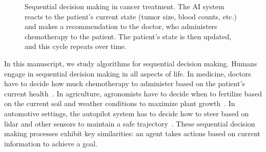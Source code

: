 \begin{figure}[htbp]
    \caption{Sequential decision making in cancer treatment. The AI system reacts to the patient's current state (tumor size, blood counts, etc.) and makes a recommendation to the doctor, who administers chemotherapy to the patient. The patient's state is then updated, and this cycle repeats over time.}
    \label{fig:cancer-treatment-sdm}
\end{figure}
In this manuscript, we study algorithms for sequential decision making. Humans engage in sequential decision making in all aspects of life. In medicine, doctors have to decide how much chemotherapy to administer based on the patient's current health~\cite{cancer}. In agriculture, agronomists have to decide when to fertilize based on the current soil and weather conditions to maximize plant growth~\cite{agriculture}. 
In automotive settings, the autopilot system has to decide how to steer based on lidar and other sensors to maintain a safe trajectory~\cite{driving}. 
These sequential decision making processes exhibit key similarities: an agent takes actions based on current information to achieve a goal.

